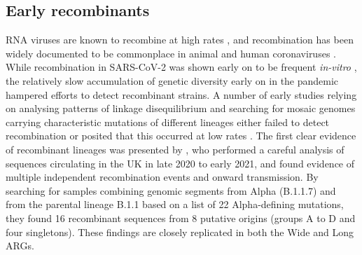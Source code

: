 \documentclass{article}
\begin{document}
\subsection{Early recombinants}
\label{sec:jackson_recombs}
RNA viruses are known to recombine at high rates
\citep{Simon2011-rna}, and recombination has been widely
documented to be commonplace in animal and human coronaviruses
\citep{Su2016-epidemiology}. While recombination in SARS-CoV-2
was shown early on to be frequent \emph{in-vitro}
\citep{Gribble2021-coronavirus}, the relatively slow accumulation
of genetic diversity early on in the pandemic hampered efforts to
detect recombinant strains. A number of early studies relying on
analysing patterns of linkage disequilibrium and searching for
mosaic genomes carrying characteristic mutations of different
lineages either failed to detect recombination or posited
that this occurred at low rates \citep[e.g.~][]{Nie2020-phylogenetic,Tang2020-origin,VanInsberghe2021-eu,Varabyou2021-rw}.
The first clear evidence of recombinant lineages was presented by
\citet{Jackson2021-ik}, who performed a careful analysis of sequences
circulating in the UK in late 2020 to early 2021, and found
evidence of multiple independent recombination events and onward
transmission.
By searching for samples combining genomic segments from Alpha (B.1.1.7) and
from the parental lineage B.1.1 based on a list of 22 Alpha-defining mutations,
they found 16 recombinant sequences from 8 putative
origins (groups A to D and four singletons).
These findings are closely replicated in both the Wide and Long ARGs.
\end{document}
